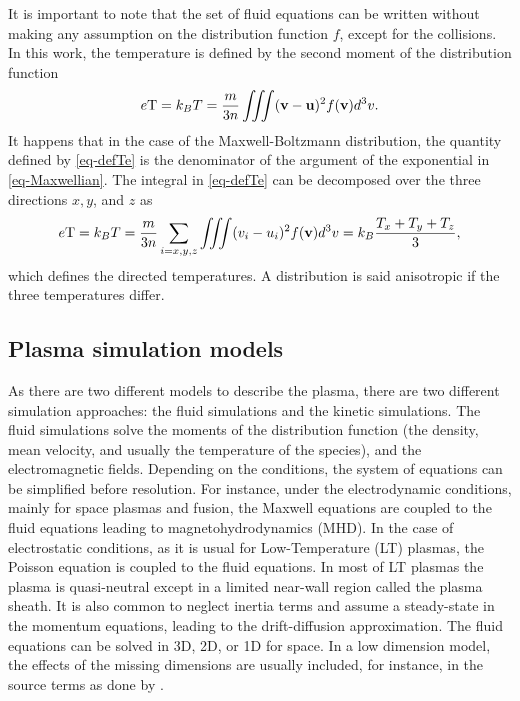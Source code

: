 It is important to note that the set of fluid equations can be written without making any assumption on the distribution function $f$, except for the collisions. 
In this work, the temperature is defined by the second moment of the distribution function
\begin{equation} \label{eq-defTe}
  e {\rm T} = k_B T = \frac{m}{3 n} \iiint ({\mathbf v} - {\mathbf u})^2 f({\mathbf v}) d^3v.
\end{equation}
It happens that in the case of the Maxwell-Boltzmann distribution, the quantity defined by \cref{eq-defTe} is the denominator of the argument of the exponential in \cref{eq-Maxwellian}.
The integral in \cref{eq-defTe} can be decomposed over the three directions $x,y$, and $z$ as
\begin{equation} \label{eq-3Te}
  e {\rm T} = k_B T = \frac{m}{3 n} \sum_{i=x,y,z} \iiint (v_i - u_i)^2 f({\mathbf v}) d^3v = k_B \frac{ T_x + T_y + T_z}{3},
\end{equation}
which defines the directed temperatures.
A distribution is said anisotropic if the three temperatures differ.

\subsection{Plasma simulation models} \label{subsec-simulations}
As there are two different models to describe the plasma, there are two different simulation approaches\string: the fluid simulations and the kinetic simulations.
The fluid simulations solve the moments of the distribution function (the density, mean velocity, and usually the temperature of the species), and the electromagnetic fields.
Depending on the conditions, the system of equations can be simplified before resolution.
For instance, under the electrodynamic conditions, mainly for space plasmas and fusion, the Maxwell equations are coupled to the fluid equations leading to magnetohydrodynamics (MHD).
In the case of electrostatic conditions, as it is usual for Low-Temperature (LT) plasmas, the Poisson equation is coupled to the fluid equations.
In most of LT plasmas the plasma is quasi-neutral except in a limited near-wall region called the plasma sheath.
It is also common to neglect inertia terms and assume a steady-state in the momentum equations, leading to the drift-diffusion approximation.
The fluid equations can be solved in \ac{3D}, \ac{2D}, or \ac{1D} for space.
In a low dimension model, the effects of the missing dimensions are usually included, for instance, in the source terms as done by \citet{barral2003a}.


